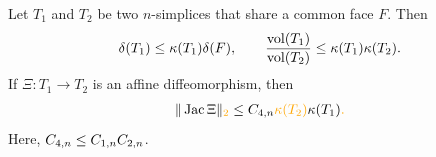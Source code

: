 \documentclass[10pt,letterpaper]{article}
\newcommand\cye[1]{%
  \protect\leavevmode
  \begingroup
    \color{red!35!yellow}%
    #1%
  \endgroup
}
\begin{document}
\begin{lemma}\label{lemma:volumecomparison}
    Let $T_1$ and $T_2$ be two $n$-simplices that share a common face $F$. Then 
    \begin{align*}
        {\delta}(T_1)
        \leq 
        \kappa(T_1)
        {\delta}(F)
        ,
        \qquad 
        \frac{ \operatorname{vol}(T_1) }{ \operatorname{vol}(T_2) }
        \leq 
        \kappa(T_1) \kappa(T_2)
        .
    \end{align*}
    If $\Xi : T_1 \rightarrow T_2$ is an affine diffeomorphism, then 
    \begin{align*}
        \| \Jacobian \Xi \|_{\cye{2}}
        \leq 
        \Cvier{n}
        \cye{\kappa(T_2)} \kappa(T_1)\cye{.}
    \end{align*}
    Here, $C_{4,n} \leq C_{1,n} C_{2,n}$. 
\end{lemma}

    

\end{document}
